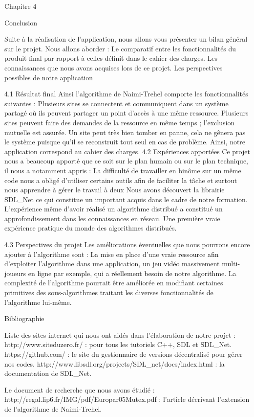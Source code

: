 \documentclass[a4paper,french,towsides,10pt]{book}
\begin{document}
Chapitre 4

Conclusion

Suite à la réalisation de l’application, nous allons vous présenter un bilan général sur le projet. Nous allons aborder :
 Le comparatif entre les fonctionnalités du produit final par rapport à celles définit dans le cahier des charges.
Les connaissances que nous avons acquises lors de ce projet.
Les perspectives possibles de notre application

4.1 Résultat final
Ainsi l’algorithme de Naimi-Trehel comporte les fonctionnalités suivantes :
Plusieurs sites se connectent et communiquent dans un système partagé où ils peuvent partager un point d’accès à une même ressource.
Plusieurs sites peuvent faire des demandes de la ressource en même temps ; l’exclusion mutuelle est assurée.
Un site peut très bien tomber en panne, cela ne gênera pas le système puisque qu’il se reconstruit tout seul en cas de problème.
Ainsi, notre application correspond au cahier des charges.
4.2 Expériences apportées
Ce projet nous a beaucoup apporté que ce soit sur le plan humain ou sur le plan technique, il nous a notamment appris :
La difficulté de travailler en binôme sur un même code nous a obligé d’utiliser certains outils afin de faciliter la tâche et surtout nous apprendre à gérer le travail à deux
Nous avons découvert la librairie SDL\_Net ce qui constitue un important acquis dans le cadre de notre formation.
L’expérience même d’avoir réalisé un algorithme distribué a constitué un approfondissement dans les connaissances en réseau.
Une première vraie expérience pratique du monde des algorithmes distribués.


4.3 Perspectives du projet
Les améliorations éventuelles que nous pourrons encore ajouter à l’algorithme sont :
La mise en place d’une vraie ressource afin d’exploiter l’algorithme dans une application, un jeu vidéo massivement multi-joueurs en ligne par exemple, qui a réellement besoin de notre algorithme.
La complexité de l’algorithme pourrait être améliorée en modifiant certaines primitives des sous-algorithmes traitant les diverses fonctionnalités de l’algorithme lui-même.


















Bibliographie

Liste des sites internet qui nous ont aidés dans l’élaboration de notre projet :
http://www.siteduzero.fr/ : pour tous les tutoriels C++, SDL et SDL\_Net.
https://github.com/ : le site du gestionnaire de versions décentralisé pour gérer nos codes.
http://www.libsdl.org/projects/SDL\_net/docs/index.html : la documentation de SDL\_Net.

Le document de recherche que nous avons étudié :
http://regal.lip6.fr/IMG/pdf/Europar05Mutex.pdf : l’article décrivant l’extension de l’algorithme de Naimi-Trehel.
\end{document}
